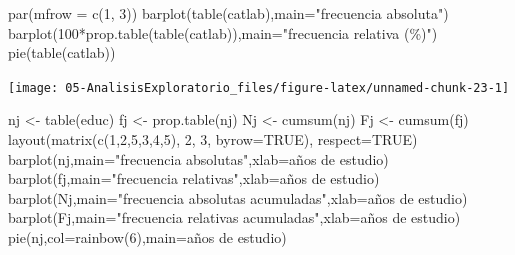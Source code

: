 \documentclass[
]{book}
\newenvironment{Shaded}{\begin{snugshade}}{\end{snugshade}}
\newcommand{\AttributeTok}[1]{\textcolor[rgb]{0.77,0.63,0.00}{#1}}
\newcommand{\ConstantTok}[1]{\textcolor[rgb]{0.00,0.00,0.00}{#1}}
\newcommand{\DecValTok}[1]{\textcolor[rgb]{0.00,0.00,0.81}{#1}}
\newcommand{\FunctionTok}[1]{\textcolor[rgb]{0.00,0.00,0.00}{#1}}
\newcommand{\NormalTok}[1]{#1}
\newcommand{\OtherTok}[1]{\textcolor[rgb]{0.56,0.35,0.01}{#1}}
\newcommand{\SpecialCharTok}[1]{\textcolor[rgb]{0.00,0.00,0.00}{#1}}
\newcommand{\StringTok}[1]{\textcolor[rgb]{0.31,0.60,0.02}{#1}}
\theoremstyle{break}
\theoremstyle{nonumberplain}
\begin{document}
\begin{Shaded}
\begin{Highlighting}[]
\FunctionTok{par}\NormalTok{(}\AttributeTok{mfrow =} \FunctionTok{c}\NormalTok{(}\DecValTok{1}\NormalTok{, }\DecValTok{3}\NormalTok{))}
\FunctionTok{barplot}\NormalTok{(}\FunctionTok{table}\NormalTok{(catlab),}\AttributeTok{main=}\StringTok{"frecuencia absoluta"}\NormalTok{)}
\FunctionTok{barplot}\NormalTok{(}\DecValTok{100}\SpecialCharTok{*}\FunctionTok{prop.table}\NormalTok{(}\FunctionTok{table}\NormalTok{(catlab)),}\AttributeTok{main=}\StringTok{"frecuencia relativa (\%)"}\NormalTok{)}
\FunctionTok{pie}\NormalTok{(}\FunctionTok{table}\NormalTok{(catlab))}
\end{Highlighting}
\end{Shaded}

\begin{center}\texttt{[image: 05-AnalisisExploratorio\_files/figure-latex/unnamed-chunk-23-1]} \end{center}

\begin{Shaded}
\begin{Highlighting}[]
\NormalTok{nj }\OtherTok{\textless{}{-}} \FunctionTok{table}\NormalTok{(educ)}
\NormalTok{fj }\OtherTok{\textless{}{-}} \FunctionTok{prop.table}\NormalTok{(nj)}
\NormalTok{Nj }\OtherTok{\textless{}{-}} \FunctionTok{cumsum}\NormalTok{(nj)}
\NormalTok{Fj }\OtherTok{\textless{}{-}} \FunctionTok{cumsum}\NormalTok{(fj)}
\FunctionTok{layout}\NormalTok{(}\FunctionTok{matrix}\NormalTok{(}\FunctionTok{c}\NormalTok{(}\DecValTok{1}\NormalTok{,}\DecValTok{2}\NormalTok{,}\DecValTok{5}\NormalTok{,}\DecValTok{3}\NormalTok{,}\DecValTok{4}\NormalTok{,}\DecValTok{5}\NormalTok{), }\DecValTok{2}\NormalTok{, }\DecValTok{3}\NormalTok{, }\AttributeTok{byrow=}\ConstantTok{TRUE}\NormalTok{), }\AttributeTok{respect=}\ConstantTok{TRUE}\NormalTok{)}
\FunctionTok{barplot}\NormalTok{(nj,}\AttributeTok{main=}\StringTok{"frecuencia absolutas"}\NormalTok{,}\AttributeTok{xlab=}\StringTok{\textquotesingle{}años de estudio\textquotesingle{}}\NormalTok{)}
\FunctionTok{barplot}\NormalTok{(fj,}\AttributeTok{main=}\StringTok{"frecuencia relativas"}\NormalTok{,}\AttributeTok{xlab=}\StringTok{\textquotesingle{}años de estudio\textquotesingle{}}\NormalTok{)}
\FunctionTok{barplot}\NormalTok{(Nj,}\AttributeTok{main=}\StringTok{"frecuencia absolutas acumuladas"}\NormalTok{,}\AttributeTok{xlab=}\StringTok{\textquotesingle{}años de estudio\textquotesingle{}}\NormalTok{)}
\FunctionTok{barplot}\NormalTok{(Fj,}\AttributeTok{main=}\StringTok{"frecuencia relativas acumuladas"}\NormalTok{,}\AttributeTok{xlab=}\StringTok{\textquotesingle{}años de estudio\textquotesingle{}}\NormalTok{)}
\FunctionTok{pie}\NormalTok{(nj,}\AttributeTok{col=}\FunctionTok{rainbow}\NormalTok{(}\DecValTok{6}\NormalTok{),}\AttributeTok{main=}\StringTok{\textquotesingle{}años de estudio\textquotesingle{}}\NormalTok{)}
\end{Highlighting}
\end{Shaded}
\end{document}
